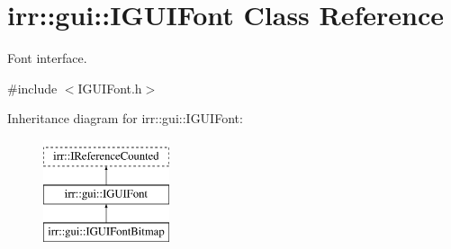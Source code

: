 \hypertarget{classirr_1_1gui_1_1IGUIFont}{}\section{irr\+:\+:gui\+:\+:I\+G\+U\+I\+Font Class Reference}
\label{classirr_1_1gui_1_1IGUIFont}


Font interface.  




{\ttfamily \#include $<$I\+G\+U\+I\+Font.\+h$>$}

Inheritance diagram for irr\+:\+:gui\+:\+:I\+G\+U\+I\+Font\+:\begin{figure}[H]
\begin{center}
\leavevmode
\includegraphics[height=3.000000cm]{classirr_1_1gui_1_1IGUIFont}
\end{center}
\end{figure}
